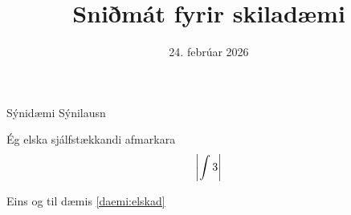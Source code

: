 \documentclass{article}
\begin{document}
\newcommand{\daemaskamtur}{Sniðmát fyrir skiladæmi}

\title{\daemaskamtur \\ \small \afangi} 
\author{\nafn}

\date{24. febrúar 2026}

\maketitle

\daemi
\label{daemi:elskad}
Sýnidæmi
Sýnilausn


\clearpage

\daemi
Ég elska sjálfstækkandi afmarkara
\[\abs*{\int 3}\]

Eins og til dæmis \ref{daemi:elskad}
\end{document}
